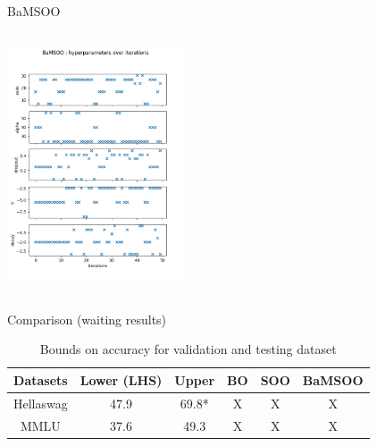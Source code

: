 \begin{frame}[allowframebreaks]{BaMSOO}
\begin{columns}
        \begin{column}{0.4\textwidth}
            \includegraphics[height = 7cm]{imgs/plots/exp11_variables_over_time.png}
            
            
        \end{column}
    \end{columns}  
\end{frame}

\begin{frame}{Comparison (waiting results)}

    \begin{table}[ht!]
        \centering
        \begin{tabular}{|c||c|c||c|c|c|}
        \hline
           Datasets  & Lower (LHS) & Upper & BO & SOO & BaMSOO \\
        \hline
           Hellaswag  & 47.9 & 69.8* & X & X & X \\
           MMLU & 37.6 & 49.3 & X & X & X  \\
        \hline
        \end{tabular}
        \caption{Bounds on accuracy for validation and testing dataset}
        \label{tab:bounds}
    \end{table}

\end{frame}
